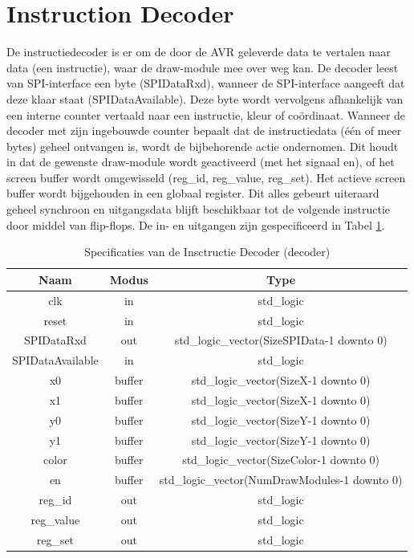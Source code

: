 \documentclass{scrreprt} %
\begin{document}
\section{Instruction Decoder}
De instructiedecoder is er om de door de AVR geleverde data te vertalen naar data (een instructie), waar de draw-module mee over weg kan. De decoder leest van SPI-interface een byte (SPIDataRxd), wanneer de SPI-interface aangeeft dat deze klaar staat (SPIDataAvailable). Deze byte wordt vervolgens afhankelijk van een interne counter vertaald naar een instructie, kleur of coördinaat. Wanneer de decoder met zijn ingebouwde counter bepaalt dat de instructiedata (één of meer bytes) geheel ontvangen is, wordt de bijbehorende actie ondernomen. Dit houdt in dat de gewenste draw-module wordt geactiveerd (met het signaal en), of het screen buffer wordt omgewisseld (reg\_id, reg\_value, reg\_set). Het actieve screen buffer wordt bijgehouden in een globaal register. Dit alles gebeurt uiteraard geheel synchroon en uitgangsdata blijft beschikbaar tot de volgende instructie door middel van flip-flops.
De in- en uitgangen zijn gespecificeerd in Tabel \ref{tab:spec-decoder}.

\begin{table}[H]
\centering
\caption{Specificaties van de Insctructie Decoder (decoder)}
\label{tab:spec-decoder}
\begin{tabular}{c c c}
	\hline\hline
 	Naam & Modus & Type\\
 	\hline
	clk & in & std\_logic \\
	reset & in & std\_logic \\	
	SPIDataRxd & out & std\_logic\_vector(SizeSPIData-1 downto 0) \\
	SPIDataAvailable & in & std\_logic \\
	x0 &  buffer & std\_logic\_vector(SizeX-1 downto 0) \\
	x1 &  buffer & std\_logic\_vector(SizeX-1 downto 0) \\
	y0 &  buffer & std\_logic\_vector(SizeY-1 downto 0) \\
	y1 &  buffer & std\_logic\_vector(SizeY-1 downto 0) \\
	color &  buffer & std\_logic\_vector(SizeColor-1 downto 0) \\
	en & buffer & std\_logic\_vector(NumDrawModules-1 downto 0)\\
	reg\_id & out & std\_logic \\
	reg\_value & out & std\_logic \\
	reg\_set & out & std\_logic \\
  	\hline
\end{tabular}
\end{table}
\end{document}
